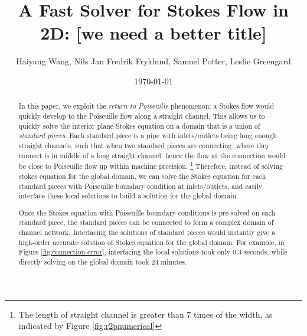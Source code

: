 \documentclass[10pt,twocolumn]{article}
\author{Haiyang Wang, Nils Jan Fredrik Fryklund, Samuel Potter, Leslie Greengard}
\date{\today}
\title{A Fast Solver for Stokes Flow in 2D: [we need a better title]}
\begin{document}
\maketitle

\begin{abstract}
  In this paper, we exploit the \textit{return to Poiseuille} phenomenon: 
  a Stokes flow would quickly develop to the Poiseuille flow along a straight channel. 
  This allows us to quickly solve the interior plane Stokes equation 
  on a domain that is a union of \textit{standard pieces}. 
  Each standard piece is a pipe with inlets/outlets 
  being long enough straight channels, such that when two standard pieces are connecting,
  where they connect is in middle of a long straight channel, hence the flow
  at the connection would be close to Poiseuille flow up within machine precision. 
  \footnote{The length of straight channel is greater than 7 times of the width, 
  as indicated by Figure \ref{fig:r2pnumerical} }
  Therefore, instead of solving stokes equation for the global domain, 
  we can solve the Stokes equation 
  for each standard pieces with Poiseuille 
  boundary condition at inlets/outlets, 
  and easily interface these local solutions 
  to build a solution for the global domain. 
  
  Once the Stokes equation with Poiseuille boundary conditions is pre-solved on each standard piece, 
  the standard pieces can be connected to form a complex domain of channel network. 
  Interfacing the solutions of standard pieces
  would instantly give a high-order accurate solution of Stokes equation 
  for the global domain. 
  For example, in Figure \ref{fig:connection-error}, interfacing the local solutions took only 0.3 seconds, while directly
  solving on the global domain took 24 minutes. 
\end{abstract}
\end{document}
